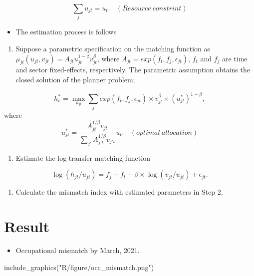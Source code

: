 \documentclass[
]{book}
\newenvironment{Shaded}{\begin{snugshade}}{\end{snugshade}}
\newcommand{\FunctionTok}[1]{\textcolor[rgb]{0.00,0.00,0.00}{#1}}
\newcommand{\NormalTok}[1]{#1}
\newcommand{\StringTok}[1]{\textcolor[rgb]{0.31,0.60,0.02}{#1}}
\providecommand{\tightlist}{%
  \setlength{\itemsep}{0pt}\setlength{\parskip}{0pt}}
\begin{document}
\[\sum_{j}u_{jt}=u_t.\ \ \ \ (Resource\ constrint)\]

\begin{itemize}
\tightlist
\item
  The estimation process is follows
\end{itemize}

\begin{enumerate}
\def\labelenumi{\arabic{enumi}.}
\tightlist
\item
  Suppose a parametric specification on the matching function as \(\mu_{jt}(u_{jt},v_{jt})=A_{jt}u_{jt}^{1-\beta}v_{jt}^{\beta}\), where \(A_{jt}=exp(f_t,f_j,\epsilon_{jt})\), \(f_t\) and \(f_j\) are time and sector fixed-effects, respectively.
  The parametric assumption obtains the closed solution of the planner problem;
\end{enumerate}

\[h_t^*=\max_{u_{jt}} \sum_j exp(f_t,f_j,\epsilon_{jt})\times v_{jt}^{\beta}\times (u_{jt}^*)^{1-\beta},\]
where
\[u_{jt}^*=\frac{A_{jt}^{1/\beta}v_{jt}}{\sum_{j'}A_{j't}^{1/\beta}v_{j't}}u_{t}.\ \ \ \ (optimal\ allocation)\]

\begin{enumerate}
\def\labelenumi{\arabic{enumi}.}
\setcounter{enumi}{1}
\tightlist
\item
  Estimate the log-transfer matching function
\end{enumerate}

\[\log(h_{jt}/u_{jt})=f_{j}+f_{t}+\beta\times\log(v_{jt}/u_{jt})+\epsilon_{jt}.\]

\begin{enumerate}
\def\labelenumi{\arabic{enumi}.}
\setcounter{enumi}{2}
\tightlist
\item
  Calculate the mismatch index with estimated parameters in Step 2.
\end{enumerate}

\hypertarget{result}{%
\chapter{Result}\label{result}}

\begin{itemize}
\tightlist
\item
  Occupational mismatch by March, 2021.
\end{itemize}

\begin{Shaded}
\begin{Highlighting}[]
\FunctionTok{include\_graphics}\NormalTok{(}\StringTok{"R/figure/occ\_mismatch.png"}\NormalTok{)}
\end{Highlighting}
\end{Shaded}
\end{document}
